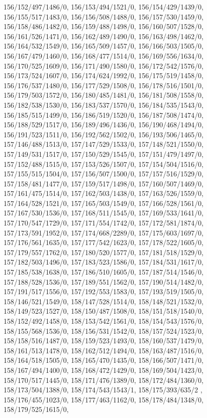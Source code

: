 {156/152/497/1486/0,%
156/153/494/1521/0,%
156/154/429/1439/0,%
156/155/517/1483/0,%
156/156/508/1488/0,%
156/157/530/1459/0,%
156/158/486/1482/0,%
156/159/488/1498/0,%
156/160/507/1528/0,%
156/161/526/1471/0,%
156/162/489/1490/0,%
156/163/498/1462/0,%
156/164/532/1549/0,%
156/165/509/1457/0,%
156/166/503/1505/0,%
156/167/479/1460/0,%
156/168/477/1514/0,%
156/169/556/1634/0,%
156/170/525/1609/0,%
156/171/490/1580/0,%
156/172/542/1576/0,%
156/173/524/1607/0,%
156/174/624/1992/0,%
156/175/519/1458/0,%
156/176/537/1480/0,%
156/177/529/1508/0,%
156/178/516/1501/0,%
156/179/503/1572/0,%
156/180/485/1481/0,%
156/181/508/1558/0,%
156/182/538/1530/0,%
156/183/537/1570/0,%
156/184/535/1543/0,%
156/185/515/1499/0,%
156/186/519/1520/0,%
156/187/508/1474/0,%
156/188/529/1517/0,%
156/189/496/1436/0,%
156/190/468/1494/0,%
156/191/523/1511/0,%
156/192/562/1502/0,%
156/193/506/1465/0,%
157/146/488/1513/0,%
157/147/529/1533/0,%
157/148/521/1550/0,%
157/149/531/1517/0,%
157/150/529/1545/0,%
157/151/479/1497/0,%
157/152/488/1515/0,%
157/153/526/1507/0,%
157/154/504/1516/0,%
157/155/515/1504/0,%
157/156/507/1500/0,%
157/157/516/1529/0,%
157/158/481/1477/0,%
157/159/517/1498/0,%
157/160/507/1469/0,%
157/161/475/1514/0,%
157/162/503/1438/0,%
157/163/526/1559/0,%
157/164/528/1521/0,%
157/165/503/1549/0,%
157/166/528/1561/0,%
157/167/530/1536/0,%
157/168/511/1545/0,%
157/169/533/1641/0,%
157/170/547/1729/0,%
157/171/554/1742/0,%
157/172/581/1874/0,%
157/173/591/1952/0,%
157/174/668/2289/0,%
157/175/603/1697/0,%
157/176/561/1635/0,%
157/177/542/1623/0,%
157/178/522/1605/0,%
157/179/557/1762/0,%
157/180/520/1577/0,%
157/181/518/1529/0,%
157/182/503/1496/0,%
157/183/523/1586/0,%
157/184/531/1617/0,%
157/185/538/1638/0,%
157/186/510/1605/0,%
157/187/514/1546/0,%
157/188/528/1536/0,%
157/189/551/1562/0,%
157/190/514/1482/0,%
157/191/517/1556/0,%
157/192/553/1583/0,%
157/193/519/1505/0,%
158/146/521/1549/0,%
158/147/528/1514/0,%
158/148/521/1532/0,%
158/149/523/1527/0,%
158/150/487/1508/0,%
158/151/518/1540/0,%
158/152/492/1458/0,%
158/153/542/1561/0,%
158/154/543/1576/0,%
158/155/568/1536/0,%
158/156/531/1542/0,%
158/157/524/1523/0,%
158/158/516/1487/0,%
158/159/523/1493/0,%
158/160/537/1479/0,%
158/161/513/1478/0,%
158/162/512/1494/0,%
158/163/487/1516/0,%
158/164/518/1505/0,%
158/165/470/1435/0,%
158/166/507/1471/0,%
158/167/494/1400/0,%
158/168/472/1429/0,%
158/169/504/1423/0,%
158/170/517/1445/0,%
158/171/476/1389/0,%
158/172/484/1360/0,%
158/173/504/1388/0,%
158/174/543/1543/1,%
158/175/393/635/2 ,%
158/176/455/1023/0,%
158/177/463/1162/0,%
158/178/484/1348/0,%
158/179/525/1615/0,%
}
